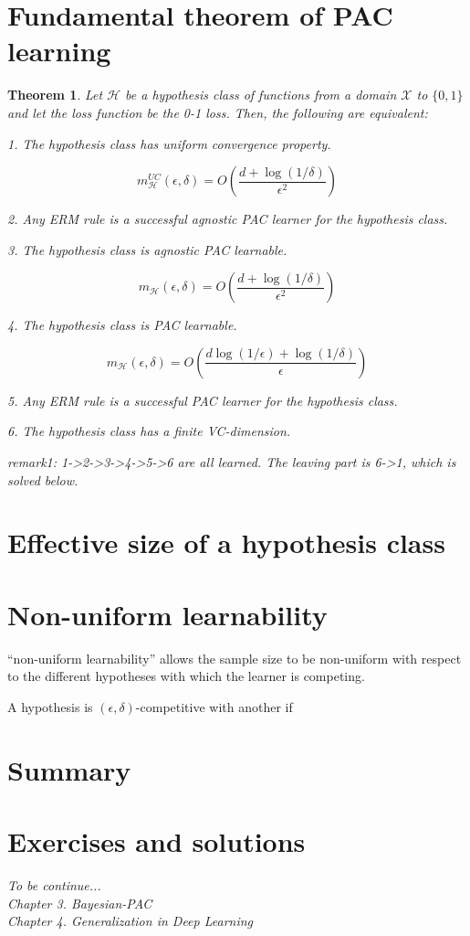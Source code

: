 \documentclass{article}
\newtheorem{theorem}{Theorem}
\begin{document}
\section{Fundamental theorem of PAC learning}

	\begin{theorem}
	Let $\mathcal{H}$ be a hypothesis class of functions from a domain $\mathcal{X}$ to $\{0,1\}$ and let the loss function be the 0-1 loss. Then, the following are equivalent:
	
	1. The hypothesis class has uniform convergence property.

	\begin{equation}
	m_\mathcal{H}^{UC}(\epsilon,\delta)=O\left(\frac{d+\log(1/\delta)}{\epsilon^2}\right)	
	\end{equation}

	2. Any ERM rule is a successful agnostic PAC learner for the hypothesis class.
	
	3. The hypothesis class is agnostic PAC learnable.
	
	\begin{equation}
	m_\mathcal{H}(\epsilon,\delta)=O\left(\frac{d+\log(1/\delta)}{\epsilon^2}\right)	
	\end{equation}

	4. The hypothesis class is PAC learnable.

	\begin{equation}
	m_\mathcal{H}(\epsilon,\delta)=O\left(\frac{d\log(1/\epsilon)+\log(1/\delta)}{\epsilon}\right)
	\end{equation}

	5. Any ERM rule is a successful PAC learner for the hypothesis class.
	
	6. The hypothesis class has a finite VC-dimension.
	\end{theorem}
	
	\textit{remark1: 1->2->3->4->5->6 are all learned. The leaving part is 6->1, which is solved below.}

\section{Effective size of a hypothesis class}

\section{Non-uniform learnability}

“non-uniform learnability” allows the sample size to be non-uniform with respect to the different hypotheses with which the learner is competing. 

A hypothesis is $(\epsilon, \delta)$-competitive with another if
\section{Summary}
%


\section{Exercises and solutions}

\textit{
      To be continue...\\
      Chapter 3. Bayesian-PAC\\
      Chapter 4. Generalization in Deep Learning}
\end{document}
